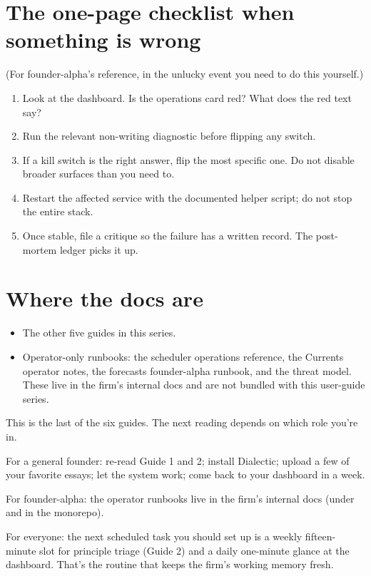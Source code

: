 \documentclass[11pt]{article}
\begin{document}
\section{The one-page checklist when something is wrong}

(For founder-alpha's reference, in the unlucky event you need to do
this yourself.)

\begin{enumerate}[leftmargin=*,itemsep=0.2em]
  \item Look at the dashboard. Is the operations card red? What does
        the red text say?
  \item Run the relevant non-writing diagnostic before flipping any
        switch.
  \item If a kill switch is the right answer, flip the most specific
        one. Do not disable broader surfaces than you need to.
  \item Restart the affected service with the documented helper
        script; do not stop the entire stack.
  \item Once stable, file a critique so the failure has a written
        record. The post-mortem ledger picks it up.
\end{enumerate}

\section{Where the docs are}

\begin{itemize}[leftmargin=*,itemsep=0.2em]
  \item The other five guides in this series.
  \item Operator-only runbooks: the scheduler operations reference, the
        Currents operator notes, the forecasts founder-alpha runbook,
        and the threat model. These live in the firm's internal docs
        and are not bundled with this user-guide series.
\end{itemize}

\begin{nextup}
This is the last of the six guides. The next reading depends on
which role you're in.

For a general founder: re-read Guide 1 and 2; install Dialectic;
upload a few of your favorite essays; let the system work; come back
to your dashboard in a week.

For founder-alpha: the operator runbooks live in the firm's internal
docs (under  and  in the
monorepo).

For everyone: the next scheduled task you should set up is a weekly
fifteen-minute slot for principle triage (Guide 2) and a daily
one-minute glance at the dashboard. That's the routine that keeps
the firm's working memory fresh.
\end{nextup}
\end{document}
